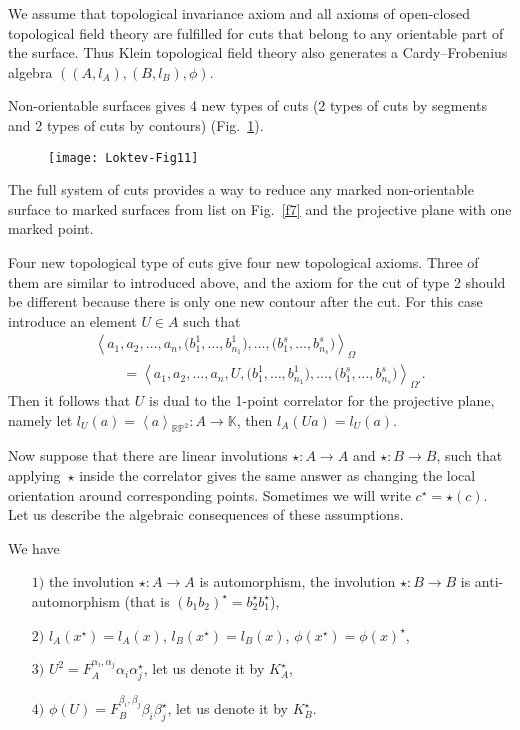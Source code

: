 \documentclass[pdftex]{sigma}
\def \lc {\left<}
\def \rc {\right>}
\begin{document}
We assume that topological invariance axiom and all axioms of
open-closed topological f\/ield theory are fulf\/illed for cuts that
belong to any orientable part of the surface. Thus Klein topological
f\/ield theory also generates a Cardy--Frobenius algebra
$((A,l_A),(B,l_B),\phi)$.

Non-orientable surfaces gives 4 new types
of cuts (2 types of cuts by segments and 2 types of cuts by
contours) (Fig.~\ref{f11}).

\begin{figure}[tbph]
\centering
\texttt{[image: Loktev-Fig11]}
\caption{}\label{f11}
\end{figure}

The full system of cuts provides a way to reduce any marked
non-orientable surface to marked surfaces from list on Fig.~\ref{f7} and
the projective plane with one marked point.

Four new topological type of cuts give four new topological axioms.
Three of them are similar to introduced above, and
the
axiom for the cut of type 2 should be dif\/ferent because
there is only one new contour after the cut.
For this case  introduce an element $U \in A$
such that
\begin{gather*}
 \lc a_1,a_2,\dots,a_n,\big(b^1_1,\dots,b^1_{n_1}\big),\dots,
\big(b^s_1,\dots,b^s_{n_s}\big) \rc_{\Omega}\\
\qquad{} =\lc a_1,a_2,\dots,a_n,U,\big(b^1_1,\dots,b^1_{n_1}\big),\dots,
\big(b^s_1,\dots,b^s_{n_s}\big)\rc_{\Omega'}.
\end{gather*}
Then it follows that $U$ is dual to the 1-point correlator
for the projective plane, namely let $l_U(a)=\lc a \rc_{{\mathbb R \mathbb P}^2}:
A\rightarrow\mathbb{K}$, then $l_A(Ua) = l_U(a)$.





Now suppose that there are linear involutions $\star:A\rightarrow A$ and $\star:B\rightarrow B$,
such that applying~$\star$ inside the correlator gives the same answer as
changing the local orientation around correspon\-ding points.  Sometimes we will write $c^\star=\star(c)$.
Let us  describe the algebraic consequences of these assumptions.

\begin{proposition}[\cite{AN}]
We have
\begin{enumerate}\itemsep=0pt
\item[$1)$] the involution $\star: A \rightarrow A$ is automorphism, the involution
$\star : B \rightarrow B$ is anti-automorphism (that is
$(b_1b_2)^\star =b_2^\star b_1^\star$),

\item[$2)$] $l_A(x^\star)=l_A(x)$, $l_B(x^\star)=l_B(x)$,
$\phi(x^\star)=\phi(x)^\star$,

\item[$3)$] $U^2=F_A^{\alpha_i,\alpha_j}\alpha_i\alpha_j^\star$,
let us denote  it by $K_A^\star$,

\item[$4)$] $\phi(U)=F_B^{\beta_i,\beta_j}\beta_i\beta_j^\star$,
let us denote  it by $K_B^\star$.
\end{enumerate}
\end{proposition}
\end{document}
